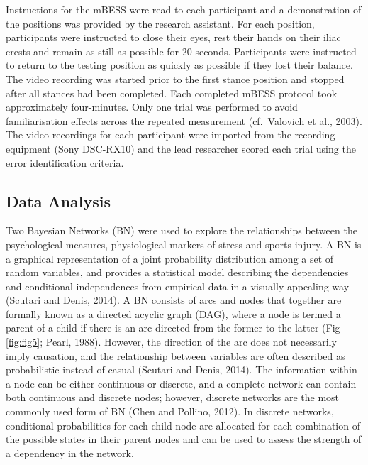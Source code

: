 \documentclass[
]{frontiersHLTH}
\begin{document}
Instructions for the mBESS were read to each participant and a
demonstration of the positions was provided by the research assistant.
For each position, participants were instructed to close their eyes,
rest their hands on their iliac crests and remain as still as possible
for 20-seconds. Participants were instructed to return to the testing
position as quickly as possible if they lost their balance. The video
recording was started prior to the first stance position and stopped
after all stances had been completed. Each completed mBESS protocol took
approximately four-minutes. Only one trial was performed to avoid
familiarisation effects across the repeated measurement (cf.~Valovich et
al., 2003). The video recordings for each participant were imported from
the recording equipment (Sony DSC-RX10) and the lead researcher scored
each trial using the error identification criteria.

\hypertarget{data-analysis}{%
\subsection{Data Analysis}\label{data-analysis}}

Two Bayesian Networks (BN) were used to explore the relationships
between the psychological measures, physiological markers of stress and
sports injury. A BN is a graphical representation of a joint probability
distribution among a set of random variables, and provides a statistical
model describing the dependencies and conditional independences from
empirical data in a visually appealing way (Scutari and Denis, 2014). A
BN consists of arcs and nodes that together are formally known as a
directed acyclic graph (DAG), where a node is termed a parent of a child
if there is an arc directed from the former to the latter (Fig
\ref{fig:fig5}; Pearl, 1988). However, the direction of the arc does not
necessarily imply causation, and the relationship between variables are
often described as probabilistic instead of casual (Scutari and Denis,
2014). The information within a node can be either continuous or
discrete, and a complete network can contain both continuous and
discrete nodes; however, discrete networks are the most commonly used
form of BN (Chen and Pollino, 2012). In discrete networks, conditional
probabilities for each child node are allocated for each combination of
the possible states in their parent nodes and can be used to assess the
strength of a dependency in the network.
\end{document}
